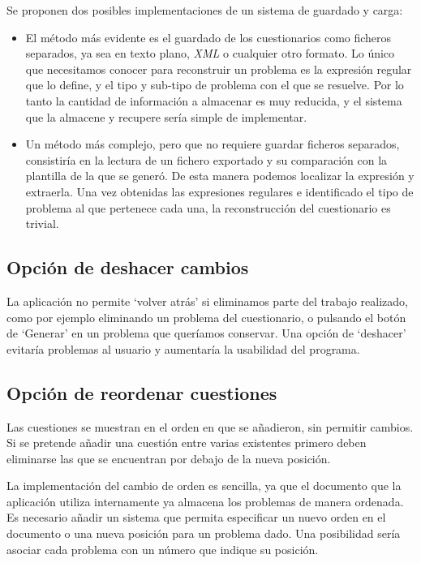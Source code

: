 Se proponen dos posibles implementaciones de un sistema de guardado y carga:
\begin{itemize}
	\item El método más evidente es el guardado de los cuestionarios como ficheros separados, ya sea en texto plano, \emph{XML} o cualquier otro formato.
	Lo único que necesitamos conocer para reconstruir un problema es la expresión regular que lo define, y el tipo y sub-tipo de problema con el que se resuelve.
	Por lo tanto la cantidad de información a almacenar es muy reducida, y el sistema que la almacene y recupere sería simple de implementar.
	\item Un método más complejo, pero que no requiere guardar ficheros separados, consistiría en la lectura de un fichero exportado y su comparación con la plantilla de la que se generó.
	De esta manera podemos localizar la expresión y extraerla.
	Una vez obtenidas las expresiones regulares e identificado el tipo de problema al que pertenece cada una, la reconstrucción del cuestionario es trivial.
\end{itemize}

\subsection{Opción de deshacer cambios}
La aplicación no permite `volver atrás' si eliminamos parte del trabajo realizado, como por ejemplo eliminando un problema del cuestionario, o pulsando el botón de `Generar' en un problema que queríamos conservar.
Una opción de `deshacer' evitaría problemas al usuario y aumentaría la usabilidad del programa.

\subsection{Opción de reordenar cuestiones}
Las cuestiones se muestran en el orden en que se añadieron, sin permitir cambios.
Si se pretende añadir una cuestión entre varias existentes primero deben eliminarse las que se encuentran por debajo de la nueva posición.

La implementación del cambio de orden es sencilla, ya que el documento que la aplicación utiliza internamente ya almacena los problemas de manera ordenada.
Es necesario añadir un sistema que permita especificar un nuevo orden en el documento o una nueva posición para un problema dado.
Una posibilidad sería asociar cada problema con un número que indique su posición.

